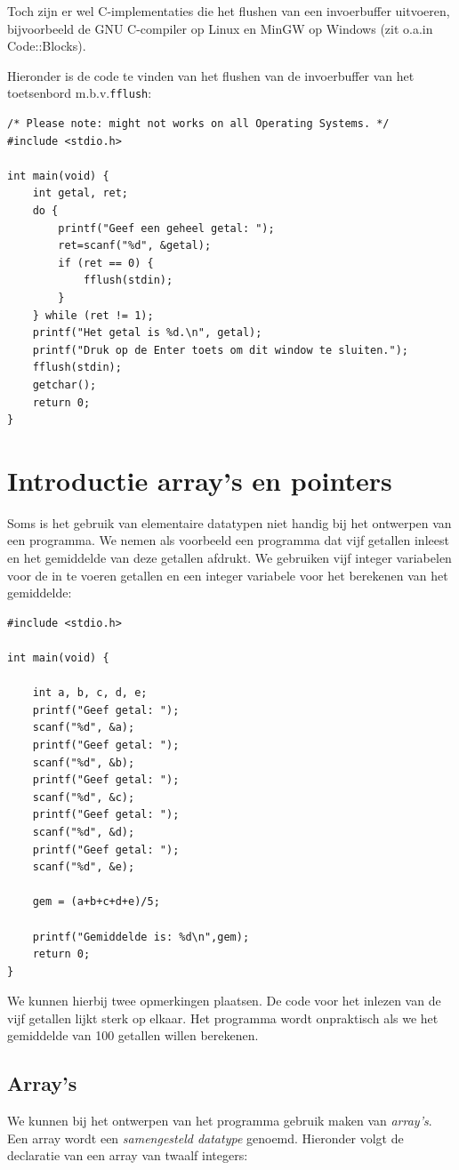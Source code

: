 \documentclass[a4paper,10pt,fleqn,twoside]{article}
\begin{document}
Toch zijn er wel C-implementaties die het flushen van een invoerbuffer uitvoeren, bijvoorbeeld de GNU C-compiler op Linux en MinGW op Windows (zit o.a.\@ in Code::Blocks).

Hieronder is de code te vinden van het flushen van de invoerbuffer van het toetsenbord m.b.v.\@ \lstinline|fflush|:

\newpage
\begin{lstlisting}
/* Please note: might not works on all Operating Systems. */
#include <stdio.h>

int main(void) {
    int getal, ret;
    do {
        printf("Geef een geheel getal: ");
        ret=scanf("%d", &getal);
        if (ret == 0) {
            fflush(stdin);
        }
    } while (ret != 1);
    printf("Het getal is %d.\n", getal);
    printf("Druk op de Enter toets om dit window te sluiten.");
    fflush(stdin);
    getchar();
    return 0;
}
\end{lstlisting}


\section{Introductie array's en pointers}
\label{sec:arypoin}
Soms is het gebruik van elementaire datatypen niet handig bij het ontwerpen van een programma. We nemen als voorbeeld een programma dat vijf getallen inleest en het gemiddelde van deze getallen afdrukt. We gebruiken vijf integer variabelen voor de in te voeren getallen en een integer variabele voor het berekenen van het gemiddelde:

\begin{lstlisting}
#include <stdio.h>

int main(void) {

	int a, b, c, d, e;
	printf("Geef getal: ");
	scanf("%d", &a);
	printf("Geef getal: ");
	scanf("%d", &b);
	printf("Geef getal: ");
	scanf("%d", &c);
	printf("Geef getal: ");
	scanf("%d", &d);
	printf("Geef getal: ");
	scanf("%d", &e);

	gem = (a+b+c+d+e)/5;

	printf("Gemiddelde is: %d\n",gem);
	return 0;
}
\end{lstlisting}

We kunnen hierbij twee opmerkingen plaatsen. De code voor het inlezen van de vijf getallen lijkt sterk op elkaar. Het programma wordt onpraktisch als we het gemiddelde van 100 getallen willen berekenen.

\subsection{Array's}
We kunnen bij het ontwerpen van het programma gebruik maken van \textsl{array's}. Een array wordt een \textsl{samengesteld datatype} genoemd. Hieronder volgt de declaratie van een array van twaalf integers:
\end{document}
